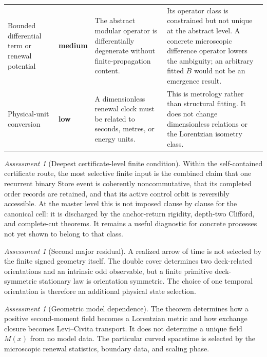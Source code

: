 \documentclass[11pt]{article}
\theoremstyle{definition}
\theoremstyle{remark}
\newtheorem{assessment}[theorem]{Assessment}
\newcommand{\lowrisk}{\textcolor{deepgreen}{\textbf{low}}}
\newcommand{\mediumrisk}{\textcolor{deepblue}{\textbf{medium}}}
\begin{document}
\begin{longtable}{L{0.25\textwidth}L{0.13\textwidth}L{0.26\textwidth}L{0.28\textwidth}}
Bounded differential term or renewal potential
& \mediumrisk
& The abstract modular operator is differentially degenerate without finite-propagation content.
& Its operator class is constrained but not unique at the abstract level.  A concrete microscopic difference operator lowers the ambiguity; an arbitrary fitted $B$ would not be an emergence result. \\
\addlinespace

Physical-unit conversion
& \lowrisk
& A dimensionless renewal clock must be related to seconds, metres, or energy units.
& This is metrology rather than structural fitting.  It does not change dimensionless relations or the Lorentzian isometry class. \\
\bottomrule
\end{longtable}
\endgroup

\begin{assessment}[Deepest certificate-level finite condition]
Within the self-contained certificate route, the most selective finite input
is the combined claim that one recurrent binary Store event is coherently
noncommutative, that its completed order records are retained, and that its
active control orbit is reversibly accessible.  At the master level this is
not imposed clause by clause for the canonical cell: it is discharged by the
anchor-return rigidity, depth-two Clifford, and complete-cut theorems.  It
remains a useful diagnostic for concrete processes not yet shown to belong to
that class.
\end{assessment}

\begin{assessment}[Second major residual]
A realized arrow of time is not selected by the finite signed geometry itself.
The double cover determines two deck-related orientations and an intrinsic
odd observable, but a finite primitive deck-symmetric stationary law is
orientation symmetric.  The choice of one temporal orientation is therefore an
additional physical state selection.
\end{assessment}

\begin{assessment}[Geometric model dependence]
The theorem determines how a positive second-moment field becomes a Lorentzian
metric and how exchange closure becomes Levi--Civita transport.  It does not
determine a unique field $M(x)$ from no model data.  The particular curved
spacetime is selected by the microscopic renewal statistics, boundary data,
and scaling phase.
\end{assessment}
\end{document}
